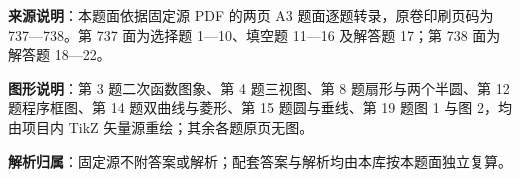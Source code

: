 

\begin{gknotice}
\textbf{来源说明}：本题面依据固定源 PDF 的两页 A3 题面逐题转录，原卷印刷页码为 737—738。第 737 面为选择题 1—10、填空题 11—16 及解答题 17；第 738 面为解答题 18—22。

\textbf{图形说明}：第 3 题二次函数图象、第 4 题三视图、第 8 题扇形与两个半圆、第 12 题程序框图、第 14 题双曲线与菱形、第 15 题圆与垂线、第 19 题图 1 与图 2，均由项目内 TikZ 矢量源重绘；其余各题原页无图。

\textbf{解析归属}：固定源不附答案或解析；配套答案与解析均由本库按本题面独立复算。
\end{gknotice}



